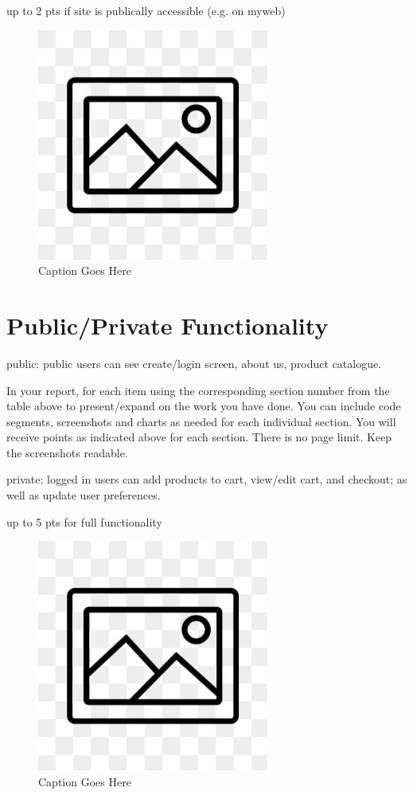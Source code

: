 \documentclass[12pt, letterpaper]{article}
\begin{document}
up to 2 pts if site is publically accessible (e.g. on myweb)

\begin{figure}[htbp]
	\centering
	\includegraphics[width=3in]{images/placeholder.jpg}
	\caption{Caption Goes Here}
 \end{figure}

 \newpage

\section{Public/Private Functionality}
public: public users can see create/login screen, about us, product catalogue.

In your report, for each item using the corresponding section number from the table above to present/expand on the work you have done. You can include code segments, screenshots and charts as needed for each individual section. You will receive points as indicated above for each section. There is no page limit. Keep the screenshots readable.

private: logged in users can add products to cart, view/edit cart, and checkout; as well as update user preferences. 

up to 5 pts for full functionality

\begin{figure}[htbp]
	\centering
	\includegraphics[width=3in]{images/placeholder.jpg}
	\caption{Caption Goes Here}
 \end{figure}
\end{document}

